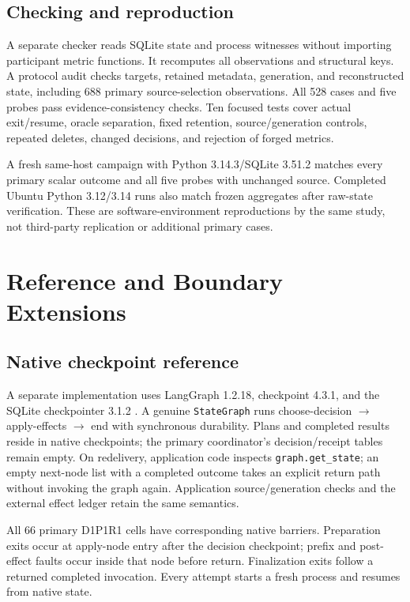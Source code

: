 \documentclass[10pt,letterpaper]{article}
\begin{document}
\subsection{Checking and reproduction}
A separate checker reads SQLite state and process witnesses without importing participant metric functions. It recomputes all observations and structural keys. A protocol audit checks targets, retained metadata, generation, and reconstructed state, including 688 primary source-selection observations. All 528 cases and five probes pass evidence-consistency checks. Ten focused tests cover actual exit/resume, oracle separation, fixed retention, source/generation controls, repeated deletes, changed decisions, and rejection of forged metrics.

A fresh same-host campaign with Python 3.14.3/SQLite 3.51.2 matches every primary scalar outcome and all five probes with unchanged source. Completed Ubuntu Python 3.12/3.14 runs also match frozen aggregates after raw-state verification. These are software-environment reproductions by the same study, not third-party replication or additional primary cases.

\section{Reference and Boundary Extensions}
\label{sec:extensions}
\subsection{Native checkpoint reference}
A separate implementation uses LangGraph 1.2.18, checkpoint 4.3.1, and the SQLite checkpointer 3.1.2 \cite{langchainGraphAPI}. A genuine \texttt{StateGraph} runs choose-decision $\rightarrow$ apply-effects $\rightarrow$ end with synchronous durability. Plans and completed results reside in native checkpoints; the primary coordinator's decision/receipt tables remain empty. On redelivery, application code inspects \texttt{graph.get\_state}; an empty next-node list with a completed outcome takes an explicit return path without invoking the graph again. Application source/generation checks and the external effect ledger retain the same semantics.

All 66 primary D1P1R1 cells have corresponding native barriers. Preparation exits occur at apply-node entry after the decision checkpoint; prefix and post-effect faults occur inside that node before return. Finalization exits follow a returned completed invocation. Every attempt starts a fresh process and resumes from native state.
\end{document}

